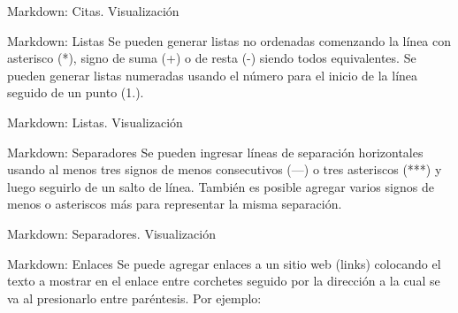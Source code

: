 
\begin{frame}{Markdown: Citas. Visualización}
\end{frame}


\begin{frame}{Markdown: Listas}
  Se pueden generar listas no ordenadas comenzando la línea con asterisco (*),
  signo de suma (+) o de resta (-) siendo todos equivalentes.
  \jump
  Se pueden generar listas numeradas usando el número para el inicio de la línea
  seguido de un punto (1.).
\end{frame}


\begin{frame}{Markdown: Listas. Visualización}
\end{frame}


\begin{frame}{Markdown: Separadores}
  Se pueden ingresar líneas de separación horizontales usando al menos tres signos
  de menos consecutivos (---) o tres asteriscos (***) y luego seguirlo de un salto
  de línea.
  \jump
  También es posible agregar varios signos de menos o asteriscos más para
  representar la misma separación.
\end{frame}


\begin{frame}{Markdown: Separadores. Visualización}
\end{frame}


\begin{frame}{Markdown: Enlaces}
  Se puede agregar enlaces a un sitio web (links) colocando el texto a mostrar en
  el enlace entre corchetes seguido por la dirección a la cual se va al
  presionarlo entre paréntesis.
  \jump
  Por ejemplo:
  \centerline{}
\end{frame}

